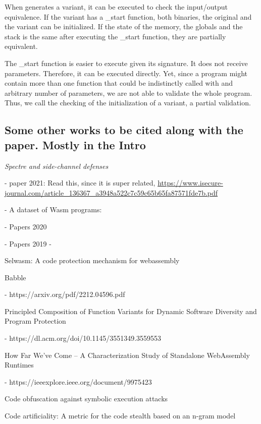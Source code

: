 When \tool generates a variant, it can be executed to check the input/output equivalence.
If the variant has a \_start function, both binaries, the original and the variant can be initialized. 
If the state of the memory, the globals and the stack is the same after executing the \_start function, they are partially equivalent.

The \_start function is easier to execute given its signature.
It does not receive parameters.
Therefore, it can be executed directly.
Yet, since a \Wasm program might contain more than one function that could be indistinctly called with and arbitrary number of parameters, we are not able to validate the whole program.
Thus, we call the checking of the initialization of a \wasm variant, a partial validation.

\subsection{Some other works to be cited along with the paper. Mostly in the Intro}

\emph{Spectre and side-channel defenses}

- paper 2021: Read this, since it is super related, \url{https://www.isecure-journal.com/article_136367_a3948a522c7c59c65b65fa87571fde7b.pdf} \cite{WasmSpectre}


- A dataset of Wasm programs: \cite{nicholson2023wasmizer}

- Papers 2020

- Papers 2019
- \cite{10.1145/3510003.3510070}

Selwasm: A code protection mechanism for webassembly


Babble

- https://arxiv.org/pdf/2212.04596.pdf

Principled Composition of Function Variants for Dynamic
Software Diversity and Program Protection

- https://dl.acm.org/doi/10.1145/3551349.3559553

How Far We’ve Come – A Characterization Study of Standalone WebAssembly Runtimes

- https://ieeexplore.ieee.org/document/9975423

Code obfuscation against symbolic execution attacks

Code artificiality: A metric for the code stealth based on an n-gram model

